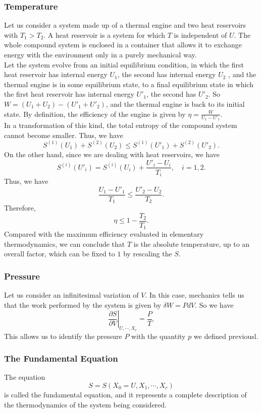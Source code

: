 \subsubsection{Temperature}
Let us consider a system made up of a thermal engine and two heat reservoirs with $T_1 > T_2$. A heat reservoir is a system for which $T$ is independent of $U$. The whole compound system is enclosed in a container that allows it to exchange energy with the environment only in a purely mechanical way. 
\\
Let the system evolve from an initial equilibrium condition, in which the first heat reservoir has internal energy $U_1$, the second has internal energy $U_2$ , and the thermal engine is in some equilibrium state, to a final equilibrium state in which the first heat reservoir has internal energy $U'_1$, the second has $U'_2$. So $W = (U_1 + U_2 ) - (U'_1 + U'_2)$, and the thermal engine is back to its initial state. By definition, the efficiency of the engine is given by $\eta = \frac{W}{U_1 - U'_1}$.
\\
In a transformation of this kind, the total entropy of the compound system cannot become smaller. Thus, we have
\[S^{(1)}(U_1) + S^{(2)}(U_2) \leq S^{(1)}(U'_1) + S^{(2)}(U'_2).\]
On the other hand, since we are dealing with heat reservoirs, we have
\[S^{(i)}(U'_i) = S^{(i)}(U_i) + \frac{U'_i - U_i}{T_i} , \quad i = 1,2.\]
Thus, we have
\[\frac{U_1 - U'_1}{T_1} \leq \frac{U'_2 - U_2}{T_2}.\]
Therefore,
\[\eta \leq 1 - \frac{T_2}{T_1}.\]
Compared with the maximum efficiency evaluated in elementary thermodynamics, we can conclude that $T$ is the absolute temperature, up to an overall factor, which can be fixed to $1$ by rescaling the $S$. 

\subsubsection{Pressure}
Let us consider an infinitesimal variation of $V$. In this case, mechanics tells us that the work performed by the system is given by $\delta W = PdV$. So we have
\[\left. \frac{\partial S}{\partial V} \right|_{U,\cdots,X_r} = \frac{P}{T}.\]
This allows us to identify the pressure $P$ with the quantity $p$ we defined previousl.


\subsubsection{The Fundamental Equation}
The equation
\[S = S(X_0 = U, X_1, \cdots, X_r)\]
is called the fundamental equation, and it represents a complete description of the thermodynamics of the system being considered.


